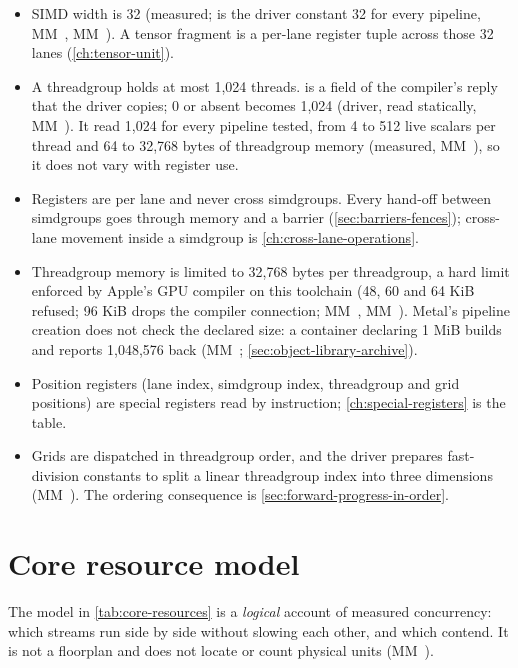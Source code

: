 \begin{itemize}
\item SIMD width is 32 (measured;  is the driver constant 32 for every pipeline, MM~,
  MM~). A tensor fragment is a per-lane register tuple across those 32 lanes (\cref{ch:tensor-unit}).
\item A threadgroup holds at most 1,024 threads.  is a field of the compiler's reply that
  the driver copies; 0 or absent becomes 1,024 (driver, read statically, MM~). It read 1,024 for every pipeline
  tested, from 4 to 512 live scalars per thread and 64 to 32,768 bytes of threadgroup memory (measured, MM~), so it
  does not vary with register use.
\item Registers are per lane and never cross simdgroups. Every hand-off between simdgroups goes through memory and a
  barrier (\cref{sec:barriers-fences}); cross-lane movement inside a simdgroup is \cref{ch:cross-lane-operations}.
\item Threadgroup memory is limited to 32,768 bytes per threadgroup, a hard limit enforced by Apple's GPU compiler on this toolchain (48, 60
  and 64 KiB refused; 96 KiB drops the compiler connection; MM~, MM~). Metal's pipeline creation does not check the
  declared size: a container declaring 1 MiB builds and reports 1,048,576 back (MM~; \cref{sec:object-library-archive}).
\item Position registers (lane index, simdgroup index, threadgroup and grid positions) are special registers read by
  instruction; \cref{ch:special-registers} is the table.
\item Grids are dispatched in threadgroup order, and the driver prepares fast-division constants to split a linear
  threadgroup index into three dimensions (MM~). The ordering consequence is \cref{sec:forward-progress-in-order}.
\end{itemize}

\section{Core resource model}\label{sec:core-logical-resource}

The model in \cref{tab:core-resources} is a \emph{logical} account of measured concurrency: which streams run side by side without slowing each
other, and which contend. It is not a floorplan and does not locate or count physical units (MM~).

